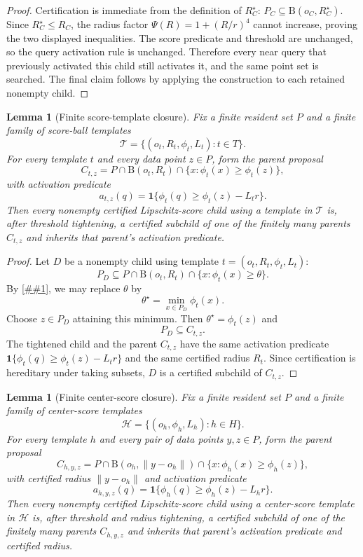 \documentclass[10pt]{article}
\newcommand{\cref}[1]{\ref{##1}}
\newtheorem{lemma}[theorem]{Lemma}
\theoremstyle{definition}
\newcommand{\Ball}{\mathrm{B}}
\begin{document}
\begin{proof}
   Certification is immediate from the definition of $R_C^\star$:
   $P_C\subseteq\Ball(o_C,R_C^\star)$.  Since $R_C^\star\le R_C$, the radius
   factor $\Psi(R)=1+(R/r)^4$ cannot increase, proving the two displayed
   inequalities.  The score predicate and threshold are unchanged, so the query
   activation rule is unchanged.  Therefore every near query that previously
   activated this child still activates it, and the same point set is searched.
   The final claim follows by applying the construction to each retained
   nonempty child.
\end{proof}

\begin{lemma}[Finite score-template closure]
   \label{lem:score-template-closure}
   Fix a finite resident set $P$ and a finite family of score-ball templates
   \[
      \mathcal T=\{(o_t,R_t,\phi_t,L_t):t\in T\}.
   \]
   For every template $t$ and every data point $z\in P$, form the parent
   proposal
   \[
      C_{t,z}
      =
      P\cap\Ball(o_t,R_t)\cap
      \{x:\phi_t(x)\ge\phi_t(z)\},
   \]
   with activation predicate
   \[
      a_{t,z}(q)=
      \mathbf 1\{\phi_t(q)\ge\phi_t(z)-L_t r\}.
   \]
   Then every nonempty certified Lipschitz-score child using a template in
   $\mathcal T$ is, after threshold tightening, a certified subchild of one of
   the finitely many parents $C_{t,z}$ and inherits that parent's activation
   predicate.
\end{lemma}

\begin{proof}
   Let $D$ be a nonempty child using template
   $t=(o_t,R_t,\phi_t,L_t)$:
   \[
      P_D\subseteq
      P\cap\Ball(o_t,R_t)\cap\{x:\phi_t(x)\ge\theta\}.
   \]
   By \cref{lem:threshold-tightening}, we may replace $\theta$ by
   \[
      \theta^\star=\min_{x\in P_D}\phi_t(x).
   \]
   Choose $z\in P_D$ attaining this minimum.  Then
   $\theta^\star=\phi_t(z)$ and
   \[
      P_D\subseteq C_{t,z}.
   \]
   The tightened child and the parent $C_{t,z}$ have the same activation
   predicate
   $\mathbf 1\{\phi_t(q)\ge\phi_t(z)-L_t r\}$ and the same certified radius
   $R_t$.  Since certification is hereditary under taking subsets, $D$ is a
   certified subchild of $C_{t,z}$.
\end{proof}

\begin{lemma}[Finite center-score closure]
   \label{lem:center-score-closure}
   Fix a finite resident set $P$ and a finite family of center-score templates
   \[
      \mathcal H=\{(o_h,\phi_h,L_h):h\in H\}.
   \]
   For every template $h$ and every pair of data points $y,z\in P$, form the
   parent proposal
   \[
      C_{h,y,z}
      =
      P\cap\Ball(o_h,\|y-o_h\|)
      \cap\{x:\phi_h(x)\ge\phi_h(z)\},
   \]
   with certified radius $\|y-o_h\|$ and activation predicate
   \[
      a_{h,y,z}(q)=
      \mathbf 1\{\phi_h(q)\ge\phi_h(z)-L_h r\}.
   \]
   Then every nonempty certified Lipschitz-score child using a center-score
   template in $\mathcal H$ is, after threshold and radius tightening, a
   certified subchild of one of the finitely many parents $C_{h,y,z}$ and
   inherits that parent's activation predicate and certified radius.
\end{lemma}
\end{document}
